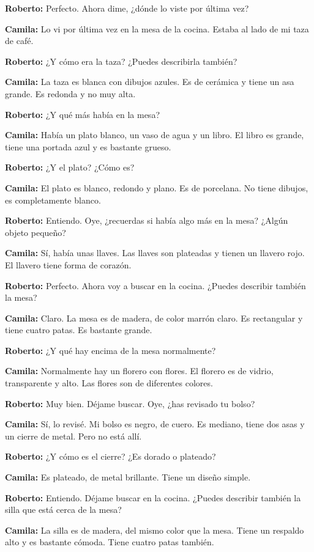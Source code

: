 \documentclass[12pt,a4paper]{article}
\begin{document}
\textbf{Roberto:} Perfecto. Ahora dime, ¿dónde lo viste por última vez?

\textbf{Camila:} Lo vi por última vez en la mesa de la cocina. Estaba al lado de mi taza de café.

\textbf{Roberto:} ¿Y cómo era la taza? ¿Puedes describirla también?

\textbf{Camila:} La taza es blanca con dibujos azules. Es de cerámica y tiene un asa grande. Es redonda y no muy alta.

\textbf{Roberto:} ¿Y qué más había en la mesa?

\textbf{Camila:} Había un plato blanco, un vaso de agua y un libro. El libro es grande, tiene una portada azul y es bastante grueso.

\textbf{Roberto:} ¿Y el plato? ¿Cómo es?

\textbf{Camila:} El plato es blanco, redondo y plano. Es de porcelana. No tiene dibujos, es completamente blanco.

\textbf{Roberto:} Entiendo. Oye, ¿recuerdas si había algo más en la mesa? ¿Algún objeto pequeño?

\textbf{Camila:} Sí, había unas llaves. Las llaves son plateadas y tienen un llavero rojo. El llavero tiene forma de corazón.

\textbf{Roberto:} Perfecto. Ahora voy a buscar en la cocina. ¿Puedes describir también la mesa?

\textbf{Camila:} Claro. La mesa es de madera, de color marrón claro. Es rectangular y tiene cuatro patas. Es bastante grande.

\textbf{Roberto:} ¿Y qué hay encima de la mesa normalmente?

\textbf{Camila:} Normalmente hay un florero con flores. El florero es de vidrio, transparente y alto. Las flores son de diferentes colores.

\textbf{Roberto:} Muy bien. Déjame buscar. Oye, ¿has revisado tu bolso?

\textbf{Camila:} Sí, lo revisé. Mi bolso es negro, de cuero. Es mediano, tiene dos asas y un cierre de metal. Pero no está allí.

\textbf{Roberto:} ¿Y cómo es el cierre? ¿Es dorado o plateado?

\textbf{Camila:} Es plateado, de metal brillante. Tiene un diseño simple.

\textbf{Roberto:} Entiendo. Déjame buscar en la cocina. ¿Puedes describir también la silla que está cerca de la mesa?

\textbf{Camila:} La silla es de madera, del mismo color que la mesa. Tiene un respaldo alto y es bastante cómoda. Tiene cuatro patas también.
\end{document}
